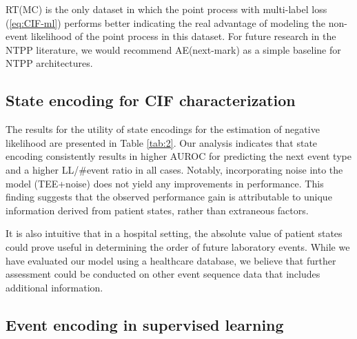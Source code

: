 \documentclass[journal,twoside,web]{ieeecolor}
\begin{document}
RT(MC) is the only dataset in which the point process with multi-label loss (\ref*{eq:CIF-ml}) performs better indicating the real advantage of modeling the non-event likelihood of the point process in this dataset. For future research in the NTPP literature, we would recommend AE(next-mark) as a simple baseline for NTPP architectures.


\subsection{State encoding for CIF characterization}


  
  



The results for the utility of state encodings for the estimation of negative likelihood are presented in Table \ref*{tab:2}. Our analysis indicates that state encoding consistently results in higher AUROC for predicting the next event type and a higher LL/\#event ratio in all cases. Notably, incorporating noise into the model (TEE+noise) does not yield any improvements in performance. This finding suggests that the observed performance gain is attributable to unique information derived from patient states, rather than extraneous factors.


It is also intuitive that in a hospital setting, the absolute value of patient states could prove useful in determining the order of future laboratory events. While we have evaluated our model using a healthcare database, we believe that further assessment could be conducted on other event sequence data that includes additional information.



\subsection{Event encoding in supervised learning}
\end{document}
